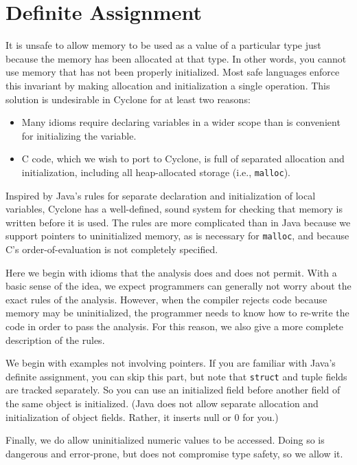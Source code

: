 \section{Definite Assignment}
 
It is unsafe to allow memory to be used as a value of a particular
type just because the memory has been allocated at that type.  In
other words, you cannot use memory that has not been properly
initialized.  Most safe languages enforce this invariant by making
allocation and initialization a single operation.  This solution is
undesirable in Cyclone for at least two reasons:
\begin{itemize}
\item Many idioms require declaring variables in a wider scope than is
  convenient for initializing the variable.
\item C code, which we wish to port to Cyclone, is full of separated
  allocation and initialization, including all heap-allocated storage
  (i.e., \texttt{malloc}).
\end{itemize}

Inspired by Java's rules for separate declaration and initialization
of local variables, Cyclone has a well-defined, sound system for
checking that memory is written before it is used.  The rules are more
complicated than in Java because we support pointers to uninitialized
memory, as is necessary for \texttt{malloc}, and because C's
order-of-evaluation is not completely specified.

Here we begin with idioms that the analysis does and does not permit.
With a basic sense of the idea, we expect programmers can generally
not worry about the exact rules of the analysis.  However, when the
compiler rejects code because memory may be uninitialized, the
programmer needs to know how to re-write the code in order to pass the
analysis.  For this reason, we also give a more complete description
of the rules.

We begin with examples not involving pointers.  If you are familiar
with Java's definite assignment, you can skip this part, but note that
\texttt{struct} and tuple fields are tracked separately.  So you can use
an initialized field before another field of the same object is
initialized.  (Java does not allow separate allocation and
initialization of object fields.  Rather, it inserts null or 0 for
you.)

Finally, we do allow uninitialized numeric values to be accessed.
Doing so is dangerous and error-prone, but does not compromise type
safety, so we allow it.

